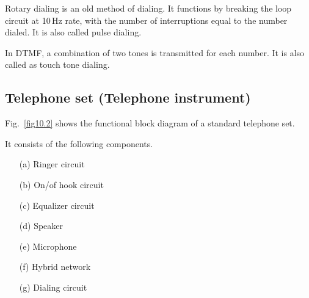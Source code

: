 Rotary dialing is an old method of dialing. It functions by breaking the loop circuit at 10\,Hz rate, with the number of interruptions equal to the number dialed. It is also called pulse dialing.

In DTMF, a combination of two tones is transmitted for each number. It is also called as touch tone dialing.

\subsection{Telephone set (Telephone instrument)}\label{sec10.2.3}

Fig.~\ref{fig10.2} shows the functional block diagram of a standard telephone set.

It consists of the following components.
\begin{itemize}
\item[(a)] Ringer circuit

\item[(b)] On/of hook circuit

\item[(c)] Equalizer circuit

\item[(d)] Speaker

\item[(e)] Microphone

\item[(f)] Hybrid network

\item[(g)] Dialing circuit
\end{itemize}

